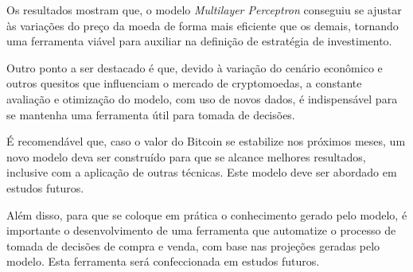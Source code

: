 \documentclass[12pt]{article}
\begin{document}
Os resultados mostram que, o modelo \textit{Multilayer Perceptron} conseguiu se
ajustar às variações do preço da moeda de forma mais eficiente que os demais, 
tornando uma ferramenta viável para auxiliar na definição de estratégia de 
investimento.

Outro ponto a ser destacado é que, devido à variação do cenário econômico e outros
quesitos que influenciam o mercado de cryptomoedas, a constante avaliação e
otimização do modelo, com uso de novos dados, é indispensável para se mantenha
uma ferramenta útil para tomada de decisões.

É recomendável que, caso o valor do Bitcoin se estabilize nos próximos meses, um
novo modelo deva ser construído para que se alcance melhores resultados, inclusive
com a aplicação de outras técnicas. Este modelo deve ser abordado em estudos 
futuros.

Além disso, para que se coloque em prática o conhecimento gerado pelo modelo, é
importante o desenvolvimento de uma ferramenta que automatize o processo de 
tomada de decisões de compra e venda, com base nas projeções geradas pelo modelo.
Esta ferramenta será confeccionada em estudos futuros.

\clearpage



\end{document}
